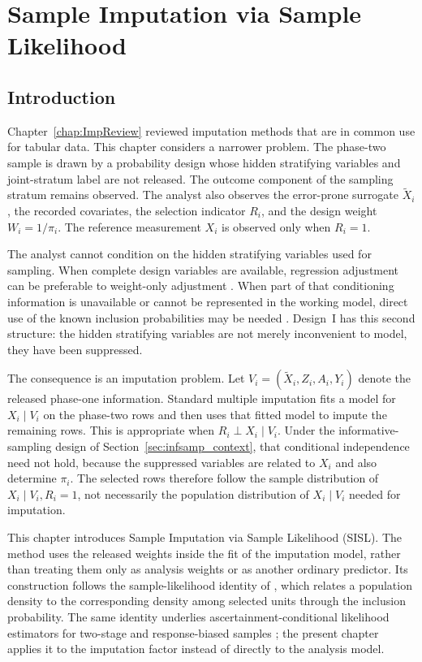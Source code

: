 \chapter{Sample Imputation via Sample Likelihood}
\label{chap:SISL}
 
\section{Introduction}
\label{sec:SISL_intro}
 
Chapter~\ref{chap:ImpReview} reviewed imputation methods that are in common use for tabular data. This chapter considers a narrower problem. The phase-two sample is drawn by a probability design whose hidden stratifying variables and joint-stratum label are not released. The outcome component of the sampling stratum remains observed. The analyst also observes the error-prone surrogate $\tilde{X}_i$, the recorded covariates, the selection indicator $R_i$, and the design weight $W_i = 1/\pi_i$. The reference measurement $X_i$ is observed only when $R_i = 1$.

The analyst cannot condition on the hidden stratifying variables used for sampling. When complete design variables are available, regression adjustment can be preferable to weight-only adjustment \citep{gelman2007struggles}. When part of that conditioning information is unavailable or cannot be represented in the working model, direct use of the known inclusion probabilities may be needed \citep{robins1997toward}. Design~I has this second structure: the hidden stratifying variables are not merely inconvenient to model, they have been suppressed.

The consequence is an imputation problem. Let $V_i=(\tilde{X}_i,Z_i,A_i,Y_i)$ denote the released phase-one information. Standard multiple imputation fits a model for $X_i\mid V_i$ on the phase-two rows and then uses that fitted model to impute the remaining rows. This is appropriate when $R_i \perp X_i \mid V_i$. Under the informative-sampling design of Section~\ref{sec:infsamp_context}, that conditional independence need not hold, because the suppressed variables are related to $X_i$ and also determine $\pi_i$. The selected rows therefore follow the sample distribution of $X_i\mid V_i,R_i=1$, not necessarily the population distribution of $X_i\mid V_i$ needed for imputation.

This chapter introduces Sample Imputation via Sample Likelihood (SISL). The method uses the released weights inside the fit of the imputation model, rather than treating them only as analysis weights or as another ordinary predictor. Its construction follows the sample-likelihood identity of \citet{pfeffermann1999parametric}, which relates a population density to the corresponding density among selected units through the inclusion probability. The same identity underlies ascertainment-conditional likelihood estimators for two-stage and response-biased samples \citep{breslow1988logistic, scott2011fitting}; the present chapter applies it to the imputation factor instead of directly to the analysis model.
 
